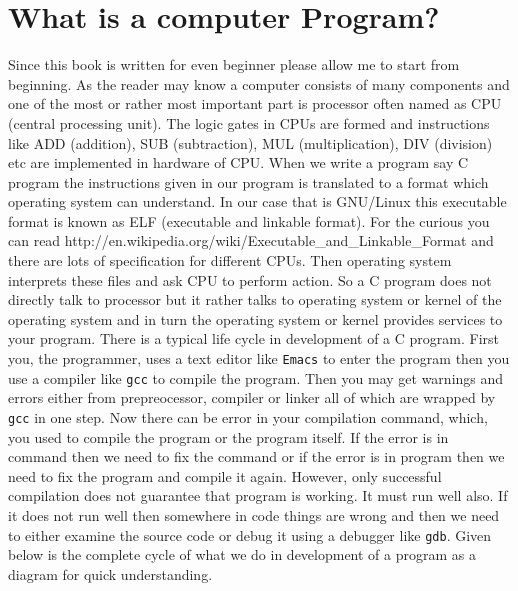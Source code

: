 \section{What is a computer Program?}
Since this book is written for even beginner please allow me to start from
beginning. As the reader may know a computer consists of many components and
one of the most or rather most important part is processor often named as CPU
(central processing unit). The logic gates in CPUs are formed and instructions
like ADD (addition), SUB (subtraction), MUL (multiplication), DIV (division)
etc are implemented in hardware of CPU. When we write a program say C program
the instructions given in our program is translated to a format which operating
system can understand. In our case that is GNU/Linux this executable format is
known as ELF (executable and linkable format). For the curious you can read
http://en.wikipedia.org/wiki/Executable\_and\_Linkable\_Format and there are
lots of specification for different CPUs. Then operating system interprets
these files and ask CPU to perform action. So a C program does not directly
talk to processor but it rather talks to operating system or kernel of the
operating system and in turn the operating system or kernel provides services
to your program. There is a typical life cycle in development of a C
program. First you, the programmer, uses a text editor like \texttt{Emacs} to
enter the program then you use a compiler like \texttt{gcc} to compile the
program. Then you may get warnings and errors either from prepreocessor,
compiler or linker all of which are wrapped by \texttt{gcc} in one step. Now
there can be error in your compilation command, which, you used to compile the
program or the program itself. If the error is in command then we need to fix
the command or if the error is in program then we need to fix the program and
compile it again. However, only successful compilation does not guarantee that
program is working. It must run well also. If it does not run well then
somewhere in code things are wrong and then we need to either examine the
source code or debug it using a debugger like \texttt{gdb}. Given below is the
complete cycle of what we do in development of a program as a diagram for quick
understanding.

